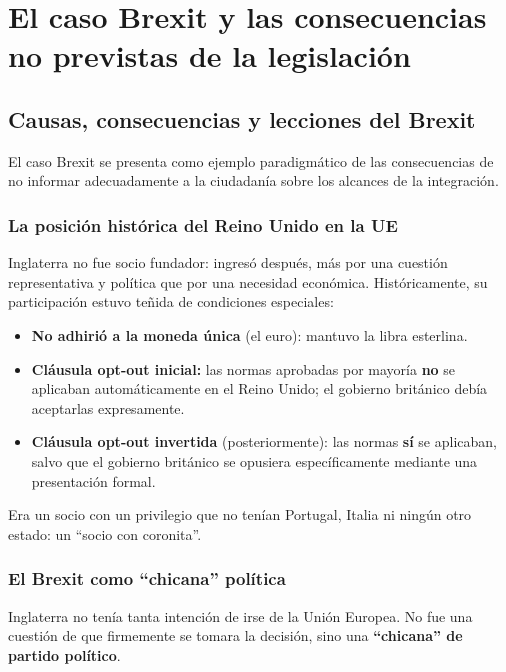 \documentclass[12pt,oneside]{book}
\begin{document}
\chapter[El caso Brexit]{El caso Brexit y las consecuencias no previstas de la legislación}

\section{Causas, consecuencias y lecciones del Brexit}

El caso Brexit se presenta como ejemplo paradigmático de las consecuencias de no informar adecuadamente a la ciudadanía sobre los alcances de la integración.

\subsection{La posición histórica del Reino Unido en la UE}

Inglaterra no fue socio fundador: ingresó después, más por una cuestión representativa y política que por una necesidad económica. Históricamente, su participación estuvo teñida de condiciones especiales:

\begin{itemize}
    \item \textbf{No adhirió a la moneda única} (el euro): mantuvo la libra esterlina.
    \item \textbf{Cláusula opt-out inicial:} las normas aprobadas por mayoría \textbf{no} se aplicaban automáticamente en el Reino Unido; el gobierno británico debía aceptarlas expresamente.
    \item \textbf{Cláusula opt-out invertida} (posteriormente): las normas \textbf{sí} se aplicaban, salvo que el gobierno británico se opusiera específicamente mediante una presentación formal.
\end{itemize}

Era un socio con un privilegio que no tenían Portugal, Italia ni ningún otro estado: un ``socio con coronita''.

\subsection{El Brexit como ``chicana'' política}

Inglaterra no tenía tanta intención de irse de la Unión Europea. No fue una cuestión de que firmemente se tomara la decisión, sino una \textbf{``chicana'' de partido político}.
\end{document}
